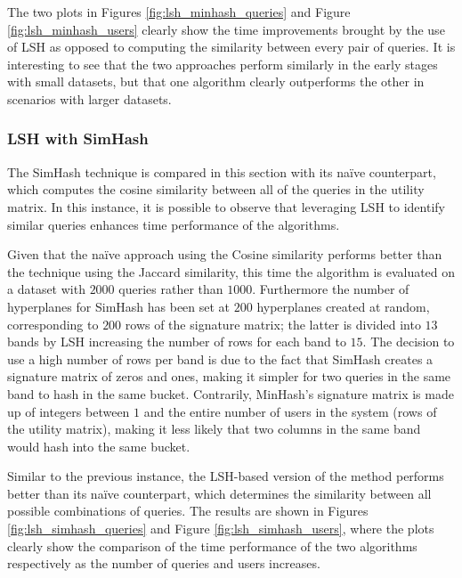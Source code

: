 The two plots in Figures \ref{fig:lsh_minhash_queries} and Figure \ref{fig:lsh_minhash_users} clearly show the time improvements brought by the use of LSH as opposed to computing the similarity between every pair of queries. It is interesting to see that the two approaches perform similarly in the early stages with small datasets, but that one algorithm clearly outperforms the other in scenarios with larger datasets. 





\subsubsection{LSH with SimHash}
The SimHash technique is compared in this section with its naïve counterpart, which computes the cosine similarity between all of the queries in the utility matrix. In this instance, it is possible to observe that leveraging LSH to identify similar queries enhances time performance of the algorithms. 

Given that the naïve approach using the Cosine similarity performs better than the technique using the Jaccard similarity, this time the algorithm is evaluated on a dataset with $2000$ queries rather than $1000$. Furthermore the number of hyperplanes for SimHash has been set at $200$ hyperplanes created at random, corresponding to $200$ rows of the signature matrix; the latter is divided into $13$ bands by LSH increasing the number of rows for each band to $15$. The decision to use a high number of rows per band is due to the fact that SimHash creates a signature matrix of zeros and ones, making it simpler for two queries in the same band to hash in the same bucket. Contrarily, MinHash's signature matrix is made up of integers between $1$ and the entire number of users in the system (rows of the utility matrix), making it less likely that two columns in the same band would hash into the same bucket. 

Similar to the previous instance, the LSH-based version of the method performs better than its naïve counterpart, which determines the similarity between all possible combinations of queries. The results are shown in Figures \ref{fig:lsh_simhash_queries} and Figure \ref{fig:lsh_simhash_users}, where the plots clearly show the comparison of the time performance of the two algorithms respectively as the number of queries and users increases.





